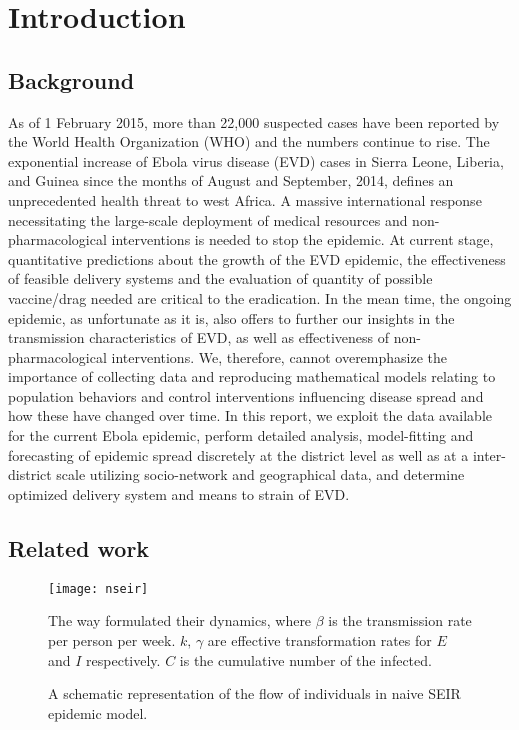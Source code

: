 
\section{Introduction}
\subsection{Background}
 As of 1 February 2015, more than 22,000 suspected cases have been 
 reported by the World Health Organization (WHO) and the
numbers continue to rise\cite{who15}.
The exponential increase of Ebola virus disease (EVD) cases in
Sierra Leone, Liberia, and Guinea since the months of
August and September, 2014, defines an unprecedented
health threat to west Africa. 
A massive international
response necessitating the large-scale deployment of
medical resources and non-pharmacological interventions is needed 
to stop the epidemic. 
At current stage, quantitative predictions about the growth 
of the EVD epidemic, the effectiveness of feasible delivery 
systems and the evaluation of quantity of possible vaccine/drag
needed are critical to the eradication. In the mean time, the ongoing 
epidemic, as unfortunate as it is, also offers
to further our insights in the transmission characteristics of EVD, 
as well as effectiveness of non-pharmacological interventions.  
We, therefore, cannot overemphasize the importance of collecting data and 
reproducing mathematical models
 relating to population behaviors and control interventions influencing disease
spread  and how these have changed over
time. In this report, we exploit the data available for the 
current Ebola epidemic, perform detailed analysis, 
model-fitting and forecasting of epidemic 
spread discretely at the district level as well as at a inter-district
 scale utilizing socio-network and geographical data, and 
 determine optimized delivery system and means to strain of EVD.

\subsection{Related work}
\begin{figure}[ht]
\centering
\texttt{[image: nseir]}
\caption{A schematic representation of the flow of individuals in naive SEIR epidemic model.} 
\medskip
\small
The way \cite{chow04} formulated their dynamics, where $\beta$ is the transmission 
rate per person per week. $k,\,\gamma$ are effective transformation 
rates for $E$ and $I$ respectively. $C$ is the cumulative number of the infected.
\label{fig:naiveseir}
\end{figure}

